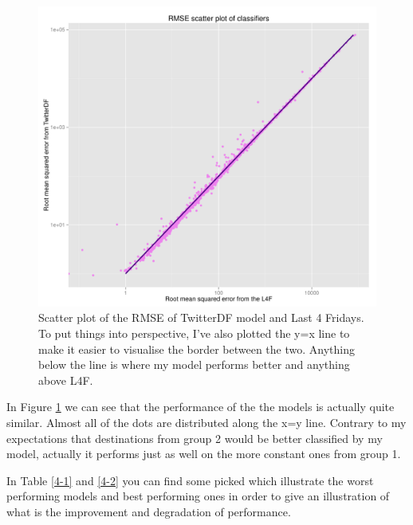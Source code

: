 \documentclass[minf,frontabs,twoside,singlespacing,parskip]{infthesis}
\begin{document}
\begin{figure}[]
\begin{center}
\includegraphics[scale=0.5]{RMSE}
\end{center}
\caption{Scatter plot of the RMSE of TwitterDF model and Last 4 Fridays. To put things into perspective, I've also plotted the y=x line to make it easier to visualise the border between the two. Anything below the line is where my model performs better and anything above L4F.  }
\label{rmse-scatter}
\end{figure}


In Figure \ref{rmse-scatter} we can see that the performance of the the models is actually quite similar. Almost all of the dots are distributed along the x=y line. Contrary to my expectations that destinations from group 2 would be better classified by my model, actually it performs just as well on the more constant ones from group 1. 

In Table \ref{4-1} and \ref{4-2} you can find some picked which illustrate the worst performing models and best performing ones in order to give an illustration of what is the improvement and degradation of performance.
\end{document}
